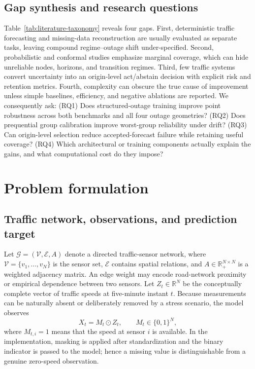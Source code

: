\documentclass[pdflatex,sn-mathphys-num]{sn-jnl}
\begin{document}
\subsection{Gap synthesis and research questions}
Table~\ref{tab:literature-taxonomy} reveals four gaps. First, deterministic
traffic forecasting and missing-data reconstruction are usually evaluated as
separate tasks, leaving compound regime--outage shift under-specified. Second,
probabilistic and conformal studies emphasize marginal coverage, which can hide
unreliable nodes, horizons, and transition regimes. Third, few traffic systems
convert uncertainty into an origin-level act/abstain decision with explicit
risk and retention metrics. Fourth, complexity can obscure the true cause of
improvement unless simple baselines, efficiency, and negative ablations are
reported. We consequently ask: (RQ1) Does structured-outage training improve
point robustness across both benchmarks and all four outage geometries? (RQ2)
Does prequential group calibration improve worst-group reliability under
drift? (RQ3) Can origin-level selection reduce accepted-forecast failure while
retaining useful coverage? (RQ4) Which architectural or training components
actually explain the gains, and what computational cost do they impose?

\section{Problem formulation}
\subsection{Traffic network, observations, and prediction target}
Let $\mathcal{G}=(\mathcal{V},\mathcal{E},A)$ denote a directed traffic-sensor
network, where $\mathcal{V}=\{v_1,\ldots,v_N\}$ is the sensor set,
$\mathcal{E}$ contains spatial relations, and $A\in\mathbb{R}_{+}^{N\times N}$
is a weighted adjacency matrix. An edge weight may encode road-network
proximity or empirical dependence between two sensors. Let
$Z_t\in\mathbb{R}^{N}$ be the conceptually complete vector of traffic speeds at
five-minute instant $t$. Because measurements can be naturally absent or
deliberately removed by a stress scenario, the model observes
\begin{equation}
 X_t=M_t\odot Z_t, \qquad M_t\in\{0,1\}^{N},
 \label{eq:masked-observation}
\end{equation}
where $M_{t,i}=1$ means that the speed at sensor $i$ is available. In the
implementation, masking is applied after standardization and the binary
indicator is passed to the model; hence a missing value is distinguishable
from a genuine zero-speed observation.
\end{document}
